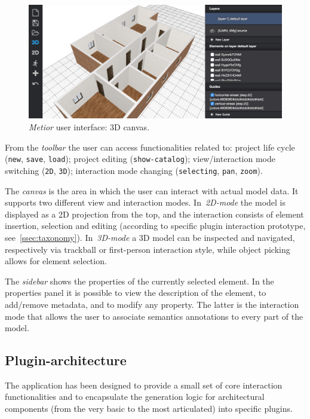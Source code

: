 \begin{figure}[htbp]
   \includegraphics[width=1\linewidth]{images/3d}
   \caption{\emph{Metior} user interface: 3D canvas.}
   \label{fig:ui3d}
\end{figure}

From the \emph{toolbar} the user can access functionalities related to: project life cycle ({\tt new}, {\tt save}, {\tt load}); project editing  ({\tt  show-catalog}); view/interaction mode switching ({\tt 2D}, {\tt  3D}); interaction mode changing ({\tt  selecting}, {\tt pan}, {\tt zoom}).


The \emph{canvas} is the area in which the user can interact with actual model data. It supports two different view and interaction modes. In~\emph{2D-mode} the model is displayed as a 2D projection from the top, and the interaction consists of element insertion, selection and editing (according to specific plugin interaction prototype, see~\ref{ssec:taxonomy}). In~\emph{3D-mode} a 3D model can be inspected and navigated, respectively via trackball or first-person interaction style, while object picking allows for element selection.

The \emph{sidebar} shows the properties of the currently selected element.
In the properties panel it is possible to view the description of the element, to add/remove metadata, and to modify any property. The latter is the interaction mode that allows the user to associate semantics annotations to every part of the model.

\subsection{Plugin-architecture}

\noindent
The application has been designed to provide a small set of core interaction functionalities and to encapsulate the generation logic for architectural components (from the very basic to the most articulated) into specific plugins.

